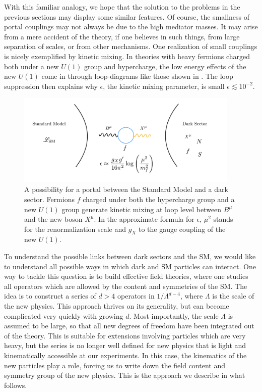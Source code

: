 With this familiar analogy, we hope that the solution to the problems in the previous sections may display some similar features. Of course, the smallness of portal couplings may not always be due to the high mediator masses. It may arise from a mere accident of the theory, if one believes in such things, from large separation of scales, or from other mechanisms. One realization of small couplings is nicely exemplified by kinetic mixing. In theories with heavy fermions charged both under a new $U(1)$ group and hypercharge, the low energy effects of the new $U(1)$ come in through loop-diagrams like those shown in . The loop suppression then explains why $\epsilon$, the kinetic mixing parameter, is small $\epsilon \lesssim 10^{-2}$.
%
\begin{figure}[t]
 \includegraphics[width=0.95\textwidth]{Dark_sectors.pdf}
 \caption[A possibility for a portal coupling and why it is small.]{A possibility for a portal between the Standard Model and a dark sector. Fermions $f$ charged under both the hypercharge group and a new $U(1)$ group generate kinetic mixing at loop level between $B^\mu$ and the new boson $X^\mu$. In the approximate formula for $\epsilon$, $\mu^2$ stands for the renormalization scale and $g_X$ to the gauge coupling of the new $U(1)$. \label{fig:Dark_sectors}}
\end{figure}
%

To understand the possible links between dark sectors and the SM, we would like to understand all possible ways in which dark and SM particles can interact. One way to tackle this question is to build effective field theories, where one studies all operators which are allowed by the content and symmetries of the SM. The idea is to construct a series of $d>4$ operators in $1/\Lambda^{d-4}$, where $\Lambda$ is the scale of the new physics. This approach thrives on its generality, but can become complicated very quickly with growing $d$. Most importantly, the scale $\Lambda$ is assumed to be large, so that all new degrees of freedom have been integrated out of the theory. This is suitable for extensions involving particles which are very heavy, but the series is no longer well defined for new physics that is light and kinematically accessible at our experiments. In this case, the kinematics of the new particles play a role, forcing us to write down the field content and symmetry group of the new physics. This is the approach we describe in what follows.

